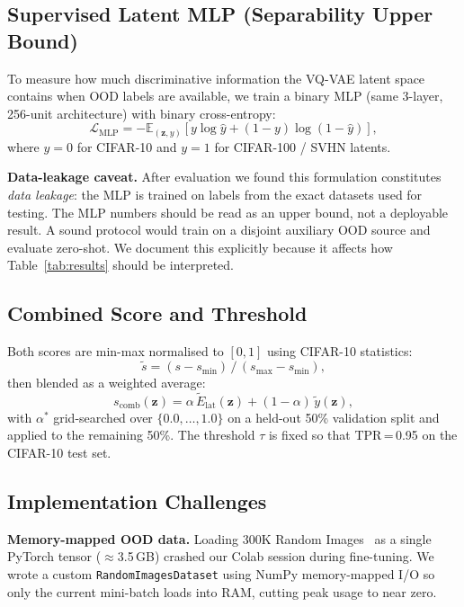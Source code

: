 \documentclass[10pt,twocolumn,letterpaper]{article}
\begin{document}
\subsection{Supervised Latent MLP (Separability Upper Bound)}

To measure how much discriminative information the VQ-VAE
latent space contains when OOD labels are available, we
train a binary MLP (same 3-layer, 256-unit architecture)
with binary cross-entropy:
\begin{equation}
  \mathcal{L}_{\mathrm{MLP}} = -\mathbb{E}_{(\mathbf{z},y)}\!
  [y\log\hat{y}+(1{-}y)\log(1{-}\hat{y})],
  \label{eq:bce}
\end{equation}
where $y\!=\!0$ for CIFAR-10 and $y\!=\!1$ for CIFAR-100 /
SVHN latents.

\textbf{Data-leakage caveat.}
After evaluation we found this formulation constitutes
\emph{data leakage}: the MLP is trained on labels from the
exact datasets used for testing.
The MLP numbers should be read as an upper bound, not a
deployable result.
A sound protocol would train on a disjoint auxiliary OOD
source and evaluate zero-shot.
We document this explicitly because it affects how
Table~\ref{tab:results} should be interpreted.

\subsection{Combined Score and Threshold}

Both scores are min-max normalised to $[0,1]$ using
CIFAR-10 statistics:
\begin{equation}
  \tilde{s} = (s-s_{\min})\,/\,(s_{\max}-s_{\min}),
  \label{eq:norm}
\end{equation}
then blended as a weighted average:
\begin{equation}
  s_{\mathrm{comb}}(\mathbf{z}) =
    \alpha\,\tilde{E}_{\mathrm{lat}}(\mathbf{z})
    +(1{-}\alpha)\,\tilde{y}(\mathbf{z}),
  \label{eq:comb}
\end{equation}
with $\alpha^*$ grid-searched over $\{0.0,\ldots,1.0\}$
on a held-out 50\% validation split and applied to the
remaining 50\%.
The threshold $\tau$ is fixed so that TPR\,=\,0.95 on the
CIFAR-10 test set.

\subsection{Implementation Challenges}

\textbf{Memory-mapped OOD data.}
Loading 300K Random Images~\cite{hendrycks2019} as a single
PyTorch tensor ($\approx$3.5\,GB) crashed our Colab session
during fine-tuning.
We wrote a custom \texttt{RandomImagesDataset} using NumPy
memory-mapped I/O so only the current mini-batch loads into
RAM, cutting peak usage to near zero.
\end{document}
